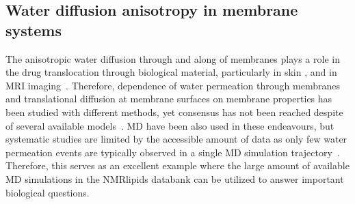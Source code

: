 \documentclass[fleqn,10pt]{wlscirep}
\begin{document}
\subsection{Water diffusion anisotropy in membrane systems}
The anisotropic water diffusion through and along of membranes plays a role in the drug translocation through biological material, particularly in skin \cite{hansen13,wen18,nitsche19,roberts21,??}, and in MRI imaging~\cite{??}. Therefore, dependence of water permeation through membranes and translational diffusion at membrane surfaces on membrane properties has been studied with different methods, yet consensus 
has not been reached despite of several available models~\cite{nitsche13,nitsche16,shinoda16,venable19,??}. MD have been also used in these endeavours, but systematic studies are limited by the accessible amount of data as only few water permeation events are typically observed in a single MD simulation trajectory~\cite{??}. Therefore, this serves as an excellent example where the large amount of available MD simulations in the NMRlipids databank can be utilized to answer important biological questions.
\end{document}
